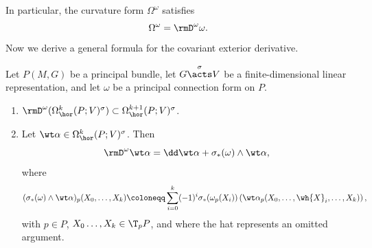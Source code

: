 In particular, the curvature form $\Omega^\omega$ satisfies 
\[\Omega^\omega=\rmD^\omega\omega.\]
Now we derive a general formula for the covariant exterior derivative.

\begin{prop}[{{\cite[Prop.~1.4.3]{RS2}}}]\label{prop 1.4.3 RS2}
    Let $P(M,G)$ be a principal bundle, let $G\overset{\sigma}{\acts}V$ be a finite-dimensional linear representation, and let $\omega$ be a principal connection form on $P$.
    \begin{enumerate}
        \item $\rmD^\omega(\Omega^k_{\hor}(P;V)^\sigma)\subset \Omega^{k+1}_{\hor}(P;V)^\sigma$.
        \item Let $\wt\alpha\in\Omega^k_{\hor}(P;V)^\sigma$. Then
        \[\rmD^\omega\wt\alpha=\dd\wt\alpha+\sigma_\ast(\omega)\wedge \wt\alpha,\label{eq 1.4.1 RS2}\]
        where
        \[(\sigma_\ast(\omega)\wedge\wt\alpha)_p(X_0,\ldots,X_k)\coloneqq \sum_{i=0}^k (-1)^i\sigma_\ast(\omega_p(X_i))\left(\wt\alpha_p(X_0,\ldots,\wh{X}_i,\ldots,X_k)\right),\]
        with $p\in P$, $X_0\ldots,X_k\in \T_pP$, and where the hat represents an omitted argument.
    \end{enumerate}
\end{prop}
